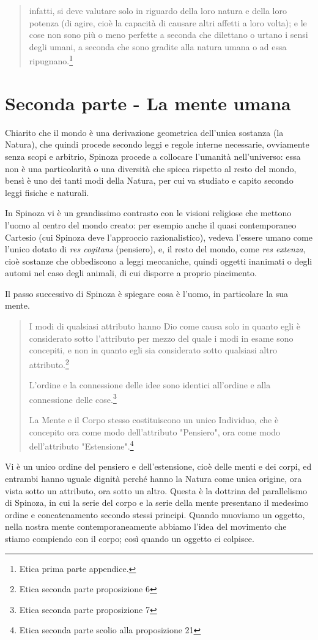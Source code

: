 \begin{quotation}
	infatti, si deve valutare solo in riguardo della loro natura e della loro potenza (di agire, cioè la capacità  di causare altri affetti a loro volta); e le cose non
	sono più o meno perfette a seconda che dilettano o urtano i sensi degli umani, a seconda
	che sono gradite alla natura umana o ad essa ripugnano.\footnote{Etica prima parte appendice.}
	
\end{quotation}
\newpage
\section{Seconda parte - La mente umana}
Chiarito che il mondo è una derivazione geometrica dell'unica sostanza (la Natura), che quindi procede secondo leggi e regole interne necessarie, ovviamente senza scopi e arbitrio, Spinoza procede a collocare l'umanità nell'universo: essa non è una particolarità o una diversità che spicca rispetto al resto del mondo, bensì è uno dei tanti modi della Natura, per cui va studiato e capito secondo leggi fisiche e naturali.

In Spinoza vi è un grandissimo contrasto con le visioni religiose che mettono l'uomo al centro del mondo creato: per esempio anche il quasi contemporaneo Cartesio (cui Spinoza deve l'approccio razionalistico), vedeva l'essere umano come l'unico dotato di \textit{res cogitans} (pensiero), e, il resto del mondo, come \textit{res extenza}, cioè sostanze che obbediscono a leggi meccaniche, quindi oggetti inanimati o degli automi nel caso degli animali, di cui disporre a proprio piacimento.

Il passo successivo di Spinoza è spiegare cosa è l'uomo, in particolare la sua mente.

\begin{quotation}
	\small I modi di qualsiasi attributo hanno Dio come causa solo in quanto egli è considerato sotto l’attributo per mezzo del quale i modi in esame sono concepiti, e non in quanto egli sia considerato sotto qualsiasi altro attributo.\footnote{Etica seconda parte proposizione 6}
	
	\small L’ordine e la connessione delle idee sono identici all’ordine e alla connessione delle cose.\footnote{Etica seconda parte proposizione 7}
	
	\small La Mente e il Corpo stesso costituiscono un unico Individuo,
	che è concepito ora come modo dell’attributo "Pensiero", ora come modo dell’attributo "Estensione".\footnote{Etica seconda parte scolio alla proposizione 21}
	
\end{quotation}
Vi è un unico ordine del pensiero e dell'estensione, cioè delle menti e dei corpi, ed entrambi hanno uguale dignità perché hanno la Natura come unica origine, ora vista sotto un attributo, ora sotto un altro. Questa è la dottrina del parallelismo di Spinoza, in cui la serie del corpo e la serie della mente presentano il medesimo ordine e concatenamento secondo stessi principi. Quando muoviamo un oggetto, nella nostra mente contemporaneamente abbiamo l'idea del movimento che stiamo compiendo con il corpo; così quando un oggetto ci colpisce.

